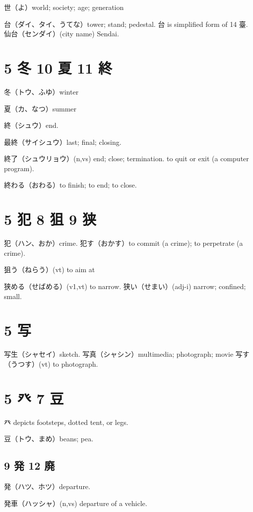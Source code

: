 世（よ）world; society; age; generation

台（ダイ、タイ、うてな）tower; stand; pedestal.
台 is simplified form of 14 臺.
仙台（センダイ）(city name) Sendai.

\section{5 冬 10 夏 11 終}

冬（トウ、ふゆ）winter

夏（カ、なつ）summer

終（シュウ）end.

最終（サイシュウ）last; final; closing.

終了（シュウリョウ）(n,vs)
end; close; termination.
to quit or exit (a computer program).

終わる（おわる）to finish; to end; to close.

\section{5 犯 8 狙 9 狭}

犯（ハン、おか）crime.
犯す（おかす）to commit (a crime); to perpetrate (a crime).

狙う（ねらう）(vt) to aim at

狭める（せばめる）(v1,vt) to narrow.
狭い（せまい）(adj-i) narrow; confined; small.

\section{5 写}

写生（シャセイ）sketch.
写真（シャシン）multimedia; photograph; movie
写す（うつす）(vt) to photograph.

\section{5 癶 7 豆}

癶 depicts footsteps, dotted tent, or legs.

豆（トウ、まめ）beans; pea.

\subsection{9 発 12 廃}

発（ハツ、ホツ）departure.

発車（ハッシャ）(n,vs) departure of a vehicle.

